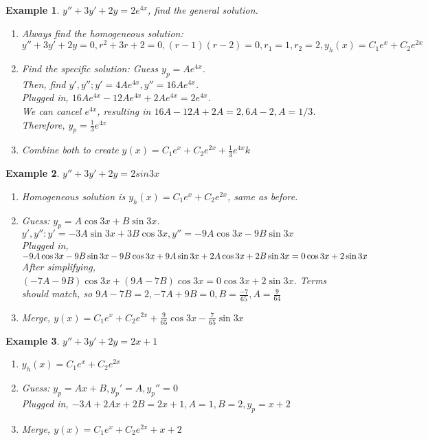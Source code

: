 \documentclass{article}
\newtheorem{example}{Example}
\begin{document}
\begin{example}
	$y''+3y'+2y=2e^{4x}$, find the general solution.
	
	 \begin{enumerate}[Step 1:]
		 \item Always find the homogeneous solution: $y''+3y'+2y=0, r^2+3r+2=0, (r-1)(r-2)=0, r_1=1, r_2=2, y_h(x)=C_1e^x+C_2e^{2x}$
	
		 \item Find the specific solution: Guess $y_p=Ae^{4x}$. 
	\\Then, find $y', y''; y'=4Ae^{4x}, y''=16Ae^{4x}$. 
	\\Plugged in, $16Ae^{4x}-12Ae^{4x}+2Ae^{4x}=2e^{4x}$. 
	\\We can cancel $e^{4x}$, resulting in $16A-12A+2A=2, 6A-2, A=1/3$. 
	\\Therefore, $y_p=\frac{1}{3}e^{4x}$

		\item Combine both to create $y(x)=C_1e^x+C_2e^{2x}+\frac{1}{3}e^{4x}k$
	\end{enumerate}
\end{example}

\begin{example}
	$y''+3y'+2y=2sin{3x}$
	\begin{enumerate}[Step 1:]
		\item Homogeneous solution is $y_h(x)=C_1e^x+C_2e^{2x}$, same as before.

		\item Guess: $y_p=A\cos{3x}+B\sin{3x}$.
	\\$y', y'': y'=-3A\sin{3x}+3B\cos{3x}, y''=-9A\cos{3x}-9B\sin{3x}$
	\\Plugged in, 
	\\$-9A\cos{3x}-9B\sin{3x}
	\\-9B\cos{3x}+9A\sin{3x}
	\\+2A\cos{3x}+2B\sin{3x}
	\\=0\cos{3x}+2\sin{3x}$
	\\After simplifying, $(-7A-9B)\cos{3x}+(9A-7B)\cos{3x}=0\cos{3x}+2\sin{3x}$.
	Terms should match, so $9A-7B=2, -7A+9B=0, B=\frac{-7}{65}, A=\frac{9}{64}$

		\item Merge, $y(x)=C_1e^x+C_2e^{2x}+\frac{9}{65}\cos{3x}-\frac{7}{65}\sin{3x}$
	\end{enumerate}
\end{example}

\begin{example}
	$y''+3y'+2y=2x+1$
	\begin{enumerate}[Step 1:]
		\item $y_h(x)=C_1e^x+C_2e^{2x}$

		\item Guess: $y_p=Ax+B, y_p'=A, y_p''=0$
			\\Plugged in, $-3A+2Ax+2B=2x+1, A=1, B=2, y_p=x+2$
		\item Merge, $y(x)=C_1e^x+C_2e^{2x}+x+2$
	\end{enumerate}
\end{example}
\end{document}
